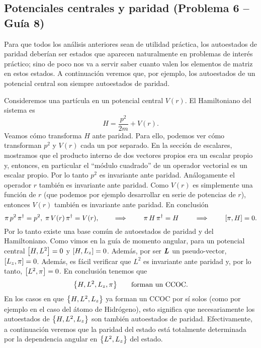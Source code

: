 \documentclass[10pt, a4paper]{article}
\numberwithin{equation}{subsection}
\begin{document}
\subsection{Potenciales centrales y paridad (Problema 6 -- Guía 8)}

Para que todos los análisis anteriores sean de utilidad práctica, los
autoestados de paridad deberían ser estados que aparecen naturalmente en
problemas de interés práctico; sino de poco nos va a servir saber cuanto valen
los elementos de matriz en estos estados. A continuación veremos que, por
ejemplo, los autoestados de un potencial central son siempre autoestados de
paridad.

Consideremos una partícula en un potencial central $V(r)$. El Hamiltoniano del
sistema es
\begin{equation}
  H = \frac{p^2}{2m} + V(r).
\end{equation}
Veamos cómo transforma $H$ ante paridad. Para ello, podemos ver cómo
transforman $p^2$ y $V(r)$ cada un por separado. En la sección de escalares,
mostramos que el producto interno de dos vectores propios era un escalar
propio y, entonces, en particular el ``módulo cuadrado'' de un operador
vectorial es un escalar propio. Por lo tanto $p^2$ es invariante ante paridad.
Análogamente el operador $r$ también es invariante ante paridad. Como $V(r)$ es
simplemente una función de $r$ (que podemos por ejemplo desarrollar en serie de
potencias de $r$), entonces $V(r)$ también es invariante ante paridad. En
conclusión
\begin{equation}
  \parityop\,p^2\,\parityop^\dagger = p^2, \;
  \parityop\,V(r)\,\parityop^\dagger = V(r), \qquad \implies \qquad
  \parityop\,H\,\parityop^\dagger = H \qquad \implies \qquad
  \comm{\parityop}{H} = 0.
\end{equation}
Por lo tanto existe una base común de autoestados de paridad y del
Hamiltoniano. Como vimos en la guía de momento angular, para un potencial
central $\comm{H}{L^2} = 0$ y $\comm{H}{L_z} = 0$. Además, por ser $\vb*{L}$
un pseudo-vector, $\comm{L_z}{\parityop} = 0$. Además, es fácil verificar que
$L^2$ es invariante ante paridad y, por lo tanto, $\comm{L^2}{\parityop} = 0$.
En conclusión tenemos que
\begin{equation}
  \set{H, L^2, L_z, \parityop} \qquad \text{forman un CCOC}.
\end{equation}
En los casos en que $\set{H, L^2, L_z}$ ya forman un CCOC por sí solos (como
por ejemplo en el caso del átomo de Hidrógeno), esto significa que
necesariamente los autoestados de $\set{H, L^2, L_z}$ son también autoestados
de paridad. Efectivamente, a continuación veremos que la paridad del estado
está totalmente determinada por la dependencia angular en $\set{L^2, L_z}$ del
estado.
\end{document}
